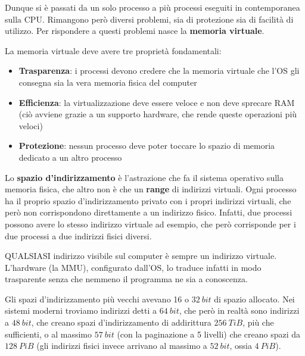 \documentclass[11pt, a4paper, titlepage, oneside]{scrbook}
\begin{document}
Dunque si è passati da un solo processo a più processi eseguiti in contemporanea sulla CPU. Rimangono però diversi problemi, sia di protezione sia di facilità di utilizzo. Per rispondere a questi problemi nasce la \textbf{memoria virtuale}. 

\begin{Proprieta}
\label{prop-memoria-virtuale}
La memoria virtuale deve avere tre proprietà fondamentali:
\begin{itemize}
    \item \textbf{Trasparenza}: i processi devono credere che la memoria virtuale che l'OS gli consegna sia la vera memoria fisica del computer
    \item \textbf{Efficienza}: la virtualizzazione deve essere veloce e non deve sprecare RAM (ciò avviene grazie a un supporto hardware, che rende queste operazioni più veloci)
    \item \textbf{Protezione}: nessun processo deve poter toccare lo spazio di memoria dedicato a un altro processo
\end{itemize}
\end{Proprieta}

\begin{Definizione}
\label{def-spazio-indirizzo}
Lo \textbf{spazio d'indirizzamento} è l'astrazione che fa il sistema operativo sulla memoria fisica, che altro non è che un \textbf{range} di indirizzi virtuali. Ogni processo ha il proprio spazio d'indirizzamento privato con i propri indirizzi virtuali, che però non corrispondono direttamente a un indirizzo fisico. Infatti, due processi possono avere lo stesso indirizzo virtuale  ad esempio, che però corrisponde per i due processi a due indirizzi fisici diversi.
\end{Definizione} 

\NB QUALSIASI indirizzo visibile sul computer è sempre un indirizzo virtuale. L'hardware (la MMU), configurato dall'OS, lo traduce infatti in modo trasparente senza che nemmeno il programma ne sia a conoscenza.

\begin{Osservazione}
\label{oss-range}
Gli spazi d'indirizzamento più vecchi avevano 16 o $\SI{32}{bit}$ di spazio allocato. Nei sistemi moderni troviamo indirizzi detti a \textbf{\boldmath$\SI[reset-math-version=false]{64}{bit}$}, che però in realtà sono indirizzi a $\SI{48}{bit}$, che creano spazi d'indirizzamento di addirittura $\SI{256}{TiB}$, più che sufficienti, o al massimo $\SI{57}{bit}$ (con la paginazione a 5 livelli) che creano spazi da $\SI{128}{PiB}$ (gli indirizzi fisici invece arrivano al massimo a $\SI{52}{bit}$, ossia $\SI{4}{PiB}$).
\end{Osservazione}
\end{document}
